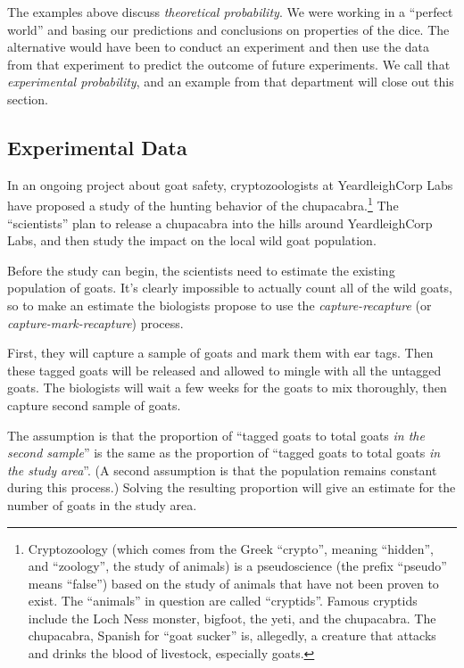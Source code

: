 The examples above discuss \textit{theoretical probability}. We were working in a ``perfect world'' and basing our predictions and conclusions on properties of the dice. The alternative would have been to conduct an experiment and then use the data from that experiment to predict the outcome of future experiments. We call that \textit{experimental probability}, and an example from that department will close out this section.

\subsection{Experimental Data}

In an ongoing project about goat safety, cryptozoologists at YeardleighCorp Labs have proposed a study of the hunting behavior of the chupacabra.\footnote{Cryptozoology (which comes from the Greek ``crypto'', meaning ``hidden'', and ``zoology'', the study of animals) is a pseudoscience (the prefix ``pseudo'' means ``false'') based on the study of animals that have not been proven to exist. The ``animals'' in question are called ``cryptids''. Famous cryptids include the Loch Ness monster, bigfoot, the yeti, and the chupacabra. The chupacabra, Spanish for ``goat sucker'' is, allegedly, a creature that attacks and drinks the blood of livestock, especially goats.} The ``scientists'' plan to release a chupacabra into the hills around YeardleighCorp Labs, and then study the impact on the local wild goat population.

Before the study can begin, the scientists need to estimate the existing population of goats. It's clearly impossible to actually count all of the wild goats, so to make an estimate the biologists propose to use the \textit{capture-recapture} (or \textit{capture-mark-recapture}) process.

First, they will capture a sample of goats and mark them with ear tags. Then these tagged goats will be released and allowed to mingle with all the untagged goats. The biologists will wait a few weeks for the goats to mix thoroughly, then capture second sample of goats.

The assumption is that the proportion of ``tagged goats to total goats \textit{in the second sample}'' is the same as the proportion of ``tagged goats to total goats \textit{in the study area}''. (A second assumption is that the population remains constant during this process.) Solving the resulting proportion will give an estimate for the number of goats in the study area.

